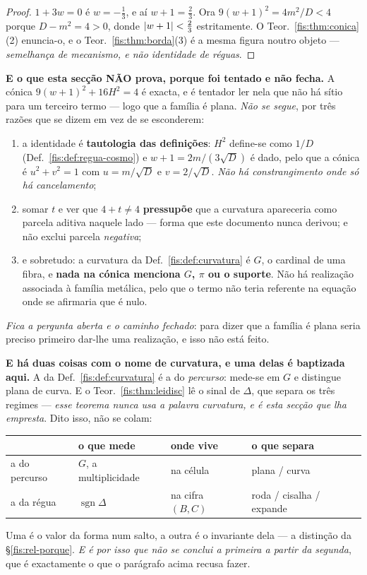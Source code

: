 \documentclass[livro.tex]{subfiles}
\begin{document}
\begin{proof}
$1+3w=0$ é $w=-\tfrac13$, e aí $w+1=\tfrac23$. Ora $9(w+1)^{2}=4m^{2}/D<4$
porque $D-m^{2}=4>0$, donde $\lvert w+1\rvert<\tfrac23$ estritamente. O
Teor.~\ref{fis:thm:conica}(2) enuncia-o, e o Teor.~\ref{fis:thm:borda}(3) é a
mesma figura noutro objeto --- \emph{semelhança de mecanismo, e não identidade de
réguas}.
\end{proof}

\medskip\noindent\textbf{E o que esta secção NÃO prova, porque foi tentado e não
fecha.} A cónica $9(w+1)^{2}+16H^{2}=4$ é exacta, e é tentador ler nela que não
há sítio para um terceiro termo --- logo que a família é plana. \emph{Não se
segue}, por três razões que se dizem em vez de se esconderem:
\begin{enumerate}\itemsep2pt
\item[(i)] a identidade é \textbf{tautologia das definições}: $H^{2}$ define-se
como $1/D$ (Def.~\ref{fis:def:regua-cosmo}) e $w+1=2m/(3\sqrt D)$ é dado, pelo
que a cónica é $u^{2}+v^{2}=1$ com $u=m/\sqrt D$ e $v=2/\sqrt D$. \emph{Não há
constrangimento onde só há cancelamento};
\item[(ii)] somar $t$ e ver que $4+t\neq4$ \textbf{pressupõe} que a curvatura
apareceria como parcela aditiva naquele lado --- forma que este documento nunca
derivou; e não exclui parcela \emph{negativa};
\item[(iii)] e sobretudo: a curvatura da Def.~\ref{fis:def:curvatura} é $G$, o
cardinal de uma fibra, e \textbf{nada na cónica menciona $G$, $\pi$ ou o
suporte}. Não há realização associada à família metálica, pelo que o termo não
teria referente na equação onde se afirmaria que é nulo.
\end{enumerate}
\emph{Fica a pergunta aberta e o caminho fechado}: para dizer que a família é
plana seria preciso primeiro dar-lhe uma realização, e isso não está feito.

\medskip\noindent\textbf{E há duas coisas com o nome de curvatura, e uma delas é
baptizada aqui.} A da Def.~\ref{fis:def:curvatura} é a do \emph{percurso}:
mede-se em $G$ e distingue plana de curva. E o Teor.~\ref{fis:thm:leidisc} lê o
sinal de $\Delta$, que separa os três regimes --- \emph{esse teorema nunca usa a
palavra curvatura, e é esta secção que lha empresta}. Dito isso, não se colam:
\begin{center}\small
\begin{tabular}{@{}llll@{}}
\toprule
 & o que mede & onde vive & o que separa \\
\midrule
a do percurso & $G$, a multiplicidade & na célula & plana / curva \\
a da régua & $\operatorname{sgn}\Delta$ & na cifra $(B,C)$ & roda / cisalha / expande \\
\bottomrule
\end{tabular}
\end{center}
Uma é o valor da forma num salto, a outra é o invariante dela --- a distinção da
§\ref{fis:rel-porque}. \emph{E é por isso que não se conclui a primeira a partir
da segunda}, que é exactamente o que o parágrafo acima recusa fazer.
\end{document}
